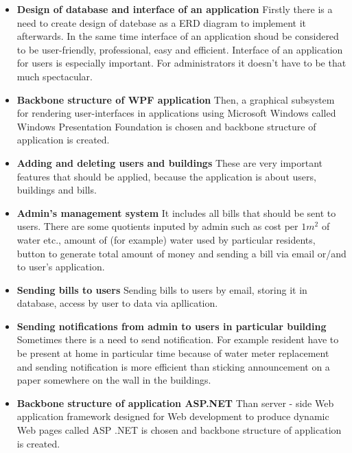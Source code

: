 \documentclass[a4paper,10pt]{report}
\begin{document}
\begin{itemize}
  \item \textbf{Design of database and interface of an application} 
  \newline Firstly there is a need to create design of datebase as a ERD diagram to implement it afterwards. In the same time interface of an application shoud be considered to be user-friendly, professional, easy and efficient. Interface of an application for users is especially important. For administrators it doesn't have to be that much spectacular. 

  \item \textbf{Backbone structure of WPF application} 
    \newline
     Then, a graphical subsystem for rendering user-interfaces in applications using Microsoft Windows called Windows Presentation Foundation is chosen and backbone structure of application is created. 

  \item \textbf{Adding and deleting users and buildings} 
    \newline These are very important features that should be applied, because the application is about users, buildings and bills. 

  \item \textbf{Admin's management system} 
    \newline It includes all bills that should be sent to users. There are some quotients inputed by admin such as cost per \(1m^2\) of water etc., amount of (for example) water used by particular residents, button to generate total amount of money and sending a bill via email or/and to user's application.

  \item \textbf{Sending bills to users} 
    \newline Sending bills to users by email, storing it in database, access by user to data via apllication.
  
  \item \textbf{Sending notifications from admin to users in particular building} 
    \newline Sometimes there is a need to send notification. For example resident have to be present at home in particular time because of water meter replacement and sending notification is more efficient than sticking announcement on a paper somewhere on the wall in the buildings. 
  
  \item \textbf{Backbone structure of application ASP.NET} 
    \newline Than server - side Web application framework designed for Web development to produce dynamic Web pages called ASP .NET is chosen and backbone structure of application is created.
  

\end{itemize}
\end{document}
